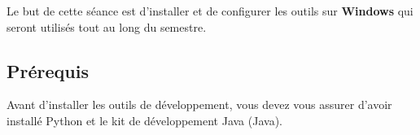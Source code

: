 
\usepackage{menukeys}
\usepackage{fontawesome6}
\usepackage{graphicx}
\usepackage{breakurl}

\usepackage{subcaption}



\ShowSolutiontrue
\ShowConseiltrue
\ShowWarningtrue
\ShowNotetrue

\titre
{}

Le but de cette séance est d'installer et de configurer les outils sur \textbf{Windows} qui seront utilisés tout au long du semestre. 

\subsection*{Prérequis}
Avant d'installer les outils de développement, vous devez vous assurer d'avoir installé Python et le kit de développement Java (Java).
